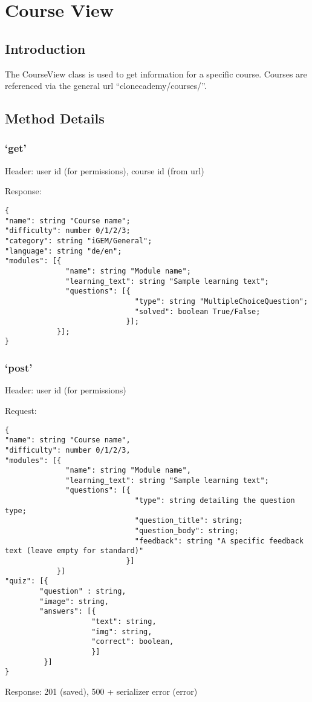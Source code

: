 \chapter*{Course View}

\section*{Introduction}\label{introduction}

The CourseView class is used to get information for a specific course.
Courses are referenced via the general url ``clonecademy/courses/''.

\section*{Method Details}\label{method-details}

\subsection*{\texorpdfstring{`get'}{get}}\label{get}

Header: user id (for permissions), course id (from url)

Response:

\begin{verbatim}
{
"name": string "Course name";
"difficulty": number 0/1/2/3;
"category": string "iGEM/General";
"language": string "de/en";
"modules": [{
              "name": string "Module name";
              "learning_text": string "Sample learning text";
              "questions": [{
                              "type": string "MultipleChoiceQuestion";
                              "solved": boolean True/False;
                            }];
            }];
}
\end{verbatim}

\subsection*{\texorpdfstring{`post'}{post}}\label{post}

Header: user id (for permissions)

Request:

\begin{verbatim}
{
"name": string "Course name",
"difficulty": number 0/1/2/3,
"modules": [{
              "name": string "Module name",
              "learning_text": string "Sample learning text";
              "questions": [{
                              "type": string detailing the question type;
                              "question_title": string;
                              "question_body": string;
                              "feedback": string "A specific feedback text (leave empty for standard)"
                            }]
            }]
"quiz": [{
        "question" : string,
        "image": string,
        "answers": [{
                    "text": string,
                    "img": string,
                    "correct": boolean,
                    }]
         }]
}
\end{verbatim}

Response: 201 (saved), 500 + serializer error (error)